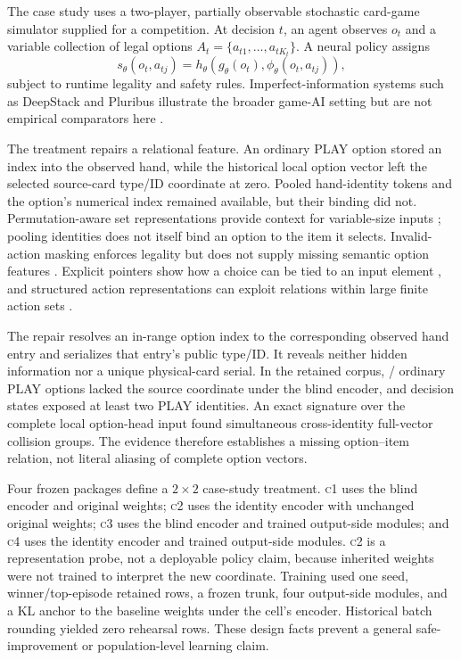 \documentclass[aps,reprint,superscriptaddress,longbibliography,floatfix]{revtex4-2}
\newcommand{\COne}{\textsc{c1}}
\newcommand{\CTwo}{\textsc{c2}}
\newcommand{\CThree}{\textsc{c3}}
\newcommand{\CFour}{\textsc{c4}}
\begin{document}
The case study uses a two-player, partially observable stochastic card-game
simulator supplied for a competition.  At decision $t$, an agent observes
$o_t$ and a variable collection of legal options
$A_t=\{a_{t1},\ldots,a_{tK_t}\}$.  A neural policy assigns
\begin{equation}
 s_\theta(o_t,a_{tj})=
 h_\theta\!\left(g_\theta(o_t),\phi_\theta(o_t,a_{tj})\right),
 \label{eq:policy-score}
\end{equation}
subject to runtime legality and safety rules.  Imperfect-information systems
such as DeepStack and Pluribus illustrate the broader game-AI setting but are
not empirical comparators here \cite{moravcik2017deepstack,brown2019pluribus}.

The treatment repairs a relational feature.  An ordinary PLAY option stored an
index into the observed hand, while the historical local option vector left the
selected source-card type/ID coordinate at zero.  Pooled hand-identity tokens
and the option's numerical index remained available, but their binding did not.
Permutation-aware set representations provide context for variable-size inputs
\cite{zaheer2017deepsets}; pooling identities does not itself bind an option to
the item it selects.  Invalid-action masking enforces legality but does not
supply missing semantic option features \cite{huang2022invalidmasking}.
Explicit pointers show how a choice can be tied to an input element
\cite{vinyals2015pointer}, and structured action representations can exploit
relations within large finite action sets \cite{chandak2019actionrepresentations}.

The repair resolves an in-range option index to the corresponding observed hand
entry and serializes that entry's public type/ID.  It reveals neither hidden
information nor a unique physical-card serial.  In the retained corpus,
\PEVLRepresentationOptions{}/\PEVLRepresentationOptions{} ordinary PLAY
options lacked the source coordinate under the blind encoder, and
\PEVLRepresentationMultiIdentityStates{} decision states exposed at least two
PLAY identities.  An exact signature over the complete local option-head input
found \PEVLRepresentationExactCollisions{} simultaneous cross-identity
full-vector collision groups.  The evidence therefore establishes a missing
option--item relation, not literal aliasing of complete option vectors.

Four frozen packages define a $2\times2$ case-study treatment.  \COne{} uses the
blind encoder and original weights; \CTwo{} uses the identity encoder with
unchanged original weights; \CThree{} uses the blind encoder and trained
output-side modules; and \CFour{} uses the identity encoder and trained
output-side modules.  \CTwo{} is a representation probe, not a deployable
policy claim, because inherited weights were not trained to interpret the new
coordinate.  Training used one seed, winner/top-episode retained rows, a frozen
trunk, four output-side modules, and a KL anchor to the baseline weights under
the cell's encoder.  Historical batch rounding yielded zero rehearsal rows.
These design facts prevent a general safe-improvement or population-level
learning claim.
\end{document}
